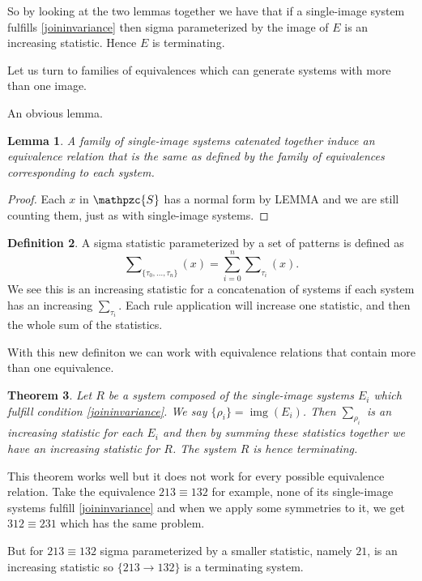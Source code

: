 \documentclass[a4paper, 11pt]{article}
\newtheorem{theorem}{Theorem}[section]
\newtheorem{lemma}[theorem]{Lemma}
\theoremstyle{definition}
\newtheorem{definition}[theorem]{Definition}
\newcommand{\Sym}{\mathpzc{S}}
\DeclareMathOperator{\img}{img}
\begin{document}
So by looking at the two lemmas together we have that if a single-image system
fulfills \eqref{joininvariance} then sigma parameterized by the image of $E$ is
an increasing statistic. Hence $E$ is terminating.

Let us turn to families of equivalences which can generate systems with more
than one image.

An obvious lemma.
\begin{lemma}
    A family of single-image systems catenated together induce an equivalence
    relation that is the same as defined by the family of equivalences
    corresponding to each system.
\end{lemma}
\begin{proof}
    Each $x$ in $\Sym$ has a normal form by LEMMA and we are still counting
    them, just as with single-image systems.
\end{proof}

\begin{definition}
    A sigma statistic parameterized by a set of patterns is defined as
    $$
        \sum\nolimits_{\{\tau_0, ..., \tau_n\}}(x) = \sum_{i=0}^{n} \sum\nolimits_{\tau_i}(x).
    $$
    We see this is an increasing statistic for a concatenation of systems if
    each system has an increasing $\sum_{\tau_i}$.  Each rule application will
    increase one statistic, and then the whole sum of the statistics.
\end{definition}

With this new definiton we can work with equivalence relations that contain more than one
equivalence.

\begin{theorem}
    Let $R$ be a system composed of the single-image systems $E_i$ which fulfill
    condition \eqref{joininvariance}. We say $\{\rho_i\} = \img(E_i)$. Then $\sum\nolimits_{\rho_i}$ 
    is an increasing statistic for each $E_i$ and then by summing these
    statistics together we have an increasing statistic for $R$.
    The system $R$ is hence terminating.
\end{theorem}

This theorem works well but it does not work for every possible equivalence relation.
Take the equivalence $213 \equiv 132$ for example, none of its single-image systems fulfill
\eqref{joininvariance} and when we apply some symmetries to it, we get $312
\equiv 231$ which has the same problem.

But for $213 \equiv 132$ sigma parameterized by a smaller statistic, namely $21$, is an
increasing statistic so $\{ 213 \to 132 \}$ is a terminating system.
\end{document}

